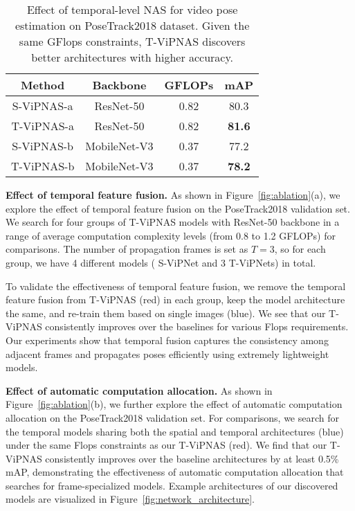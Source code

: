 \documentclass[final]{cvpr}
\begin{document}
\begin{table}[tb]
	\begin{center}
	\caption{Effect of temporal-level NAS for video pose estimation on PoseTrack2018 dataset. Given the same GFlops constraints, T-ViPNAS discovers better architectures with higher accuracy.}
		\begin{tabular}{c|c|c|c}
			\hline
			Method & Backbone &  GFLOPs  &  mAP  \\\hline
			S-ViPNAS-a & ResNet-50  & 0.82  & 80.3 \\
            T-ViPNAS-a & ResNet-50   & 0.82  & \textbf{81.6} \\ \hline
		    S-ViPNAS-b & MobileNet-V3   & 0.37  & 77.2 \\
		    T-ViPNAS-b & MobileNet-V3  & 0.37  & \textbf{78.2} \\ \hline
		\end{tabular}
	\label{tab:samllS}
	\end{center}
	\vspace{-15pt}
\end{table}


\textbf{Effect of temporal feature fusion.}
As shown in Figure~\ref{fig:ablation}(a), we explore the effect of temporal feature fusion on the PoseTrack2018 validation set. We search for four groups of T-ViPNAS models with ResNet-50 backbone in a range of average computation complexity levels (from 0.8 to 1.2 GFLOPs) for comparisons. The number of propagation frames is set as $T=3$, so for each group, we have 4 different models ( S-ViPNet and 3 T-ViPNets) in total.

To validate the effectiveness of temporal feature fusion, we remove the temporal feature fusion from T-ViPNAS (red) in each group, keep the model architecture the same, and re-train them based on single images (blue). We see that our T-ViPNAS consistently improves over the baselines for various Flops requirements. Our experiments show that temporal fusion captures the consistency among adjacent frames and propagates poses efficiently using extremely lightweight models.


\textbf{Effect of automatic computation allocation.} 
As shown in Figure~\ref{fig:ablation}(b), we further explore the effect of automatic computation allocation on the PoseTrack2018 validation set. For comparisons, we search for the temporal models sharing both the spatial and temporal architectures (blue) under the same Flops constraints as our T-ViPNAS (red). We find that our T-ViPNAS consistently improves over the baseline architectures by at least 0.5\% mAP, demonstrating the effectiveness of automatic computation allocation that searches for frame-specialized models. Example architectures of our discovered models are visualized in Figure~\ref{fig:network_architecture}. 
\end{document}

